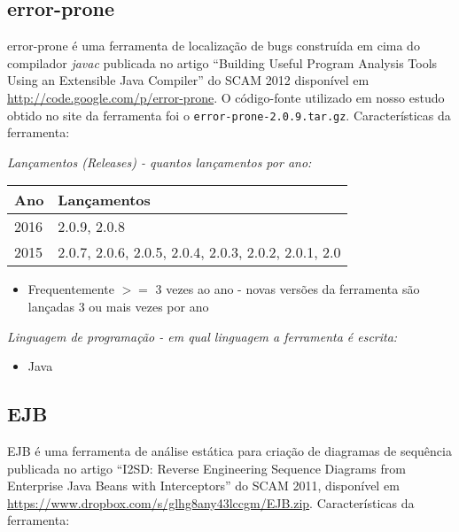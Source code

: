 \subsection{error-prone}

error-prone é uma ferramenta de localização de bugs construída em cima do
compilador {\it javac} publicada no artigo ``Building Useful Program Analysis
Tools Using an Extensible Java Compiler'' do SCAM 2012 disponível em
\url{http://code.google.com/p/error-prone}. O código-fonte utilizado em nosso
estudo obtido no site da ferramenta foi o \texttt{error-prone-2.0.9.tar.gz}.
Características da ferramenta:

\begin{description}

  \item {\it Lançamentos ({\it Releases}) - quantos lançamentos por ano:}
    \begin{table}[h!]
      \centering
      \begin{tabular}{| l | l |}
        \hline
        Ano  & Lançamentos                                          \\
        \hline
        2016 & 2.0.9, 2.0.8                                         \\
        2015 & 2.0.7, 2.0.6, 2.0.5, 2.0.4, 2.0.3, 2.0.2, 2.0.1, 2.0 \\
        \hline
      \end{tabular}
    \end{table}
    \begin{itemize}
      \item Frequentemente $>=$ 3 vezes ao ano - novas versões da ferramenta são lançadas 3 ou mais vezes por ano
    \end{itemize}

  \item {\it Linguagem de programação - em qual linguagem a ferramenta é escrita:}
    \begin{itemize}
      \item Java
    \end{itemize}

\end{description}

\subsection{EJB}

EJB é uma ferramenta de análise estática para criação de diagramas de sequência
publicada no artigo ``I2SD: Reverse Engineering Sequence Diagrams from
Enterprise Java Beans with Interceptors'' do SCAM 2011, disponível em
\url{https://www.dropbox.com/s/glhg8any43lccgm/EJB.zip}. Características da
ferramenta:

